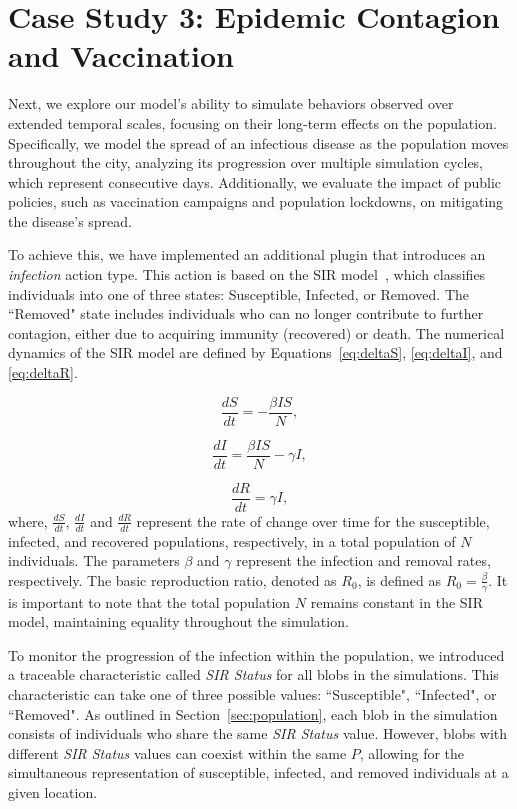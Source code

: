 \section{Case Study 3: Epidemic Contagion and Vaccination}
\label{sec:contagion}

Next, we explore our model's ability to simulate behaviors observed over extended temporal scales, focusing on their long-term effects on the population. Specifically, we model the spread of an infectious disease as the population moves throughout the city, analyzing its progression over multiple simulation cycles, which represent consecutive days. Additionally, we evaluate the impact of public policies, such as vaccination campaigns and population lockdowns, on mitigating the disease's spread.

To achieve this, we have implemented an additional plugin that introduces an \textit{infection} action type. This action is based on the SIR model~\cite{kermack1927contribution}, which classifies individuals into one of three states: Susceptible, Infected, or Removed. The ``Removed" state includes individuals who can no longer contribute to further contagion, either due to acquiring immunity (recovered) or death. The numerical dynamics of the SIR model are defined by Equations~\ref{eq:deltaS}, \ref{eq:deltaI}, and \ref{eq:deltaR}.

\begin{equation}
\label{eq:deltaS}
   { \frac{dS}{dt} } =- { \frac{\beta I S}{N} },
\end{equation}

\begin{equation}
\label{eq:deltaI}
   { \frac{dI}{dt} } = { \frac{\beta I S}{N} } - {\gamma I},
\end{equation}

\begin{equation}
\label{eq:deltaR}
   { \frac{dR}{dt} } = {\gamma I},
\end{equation}
where, $\frac{dS}{dt}$, $\frac{dI}{dt}$ and $\frac{dR}{dt}$ represent the rate of change over time for the susceptible, infected, and recovered populations, respectively, in a total population of $N$ individuals. The parameters $\beta$ and $\gamma$ represent the infection and removal rates, respectively. The basic reproduction ratio, denoted as $R_0$, is defined as $R_0 = {\frac{\beta}{\gamma}}$. It is important to note that the total population $N$ remains constant in the SIR model, maintaining equality throughout the simulation.

To monitor the progression of the infection within the population, we introduced a traceable characteristic called \textit{SIR Status} for all blobs in the simulations. This characteristic can take one of three possible values: ``Susceptible", ``Infected", or ``Removed". As outlined in Section~\ref{sec:population}, each blob in the simulation consists of individuals who share the same \textit{SIR Status} value. However, blobs with different \textit{SIR Status} values can coexist within the same $P$, allowing for the simultaneous representation of susceptible, infected, and removed individuals at a given location.


